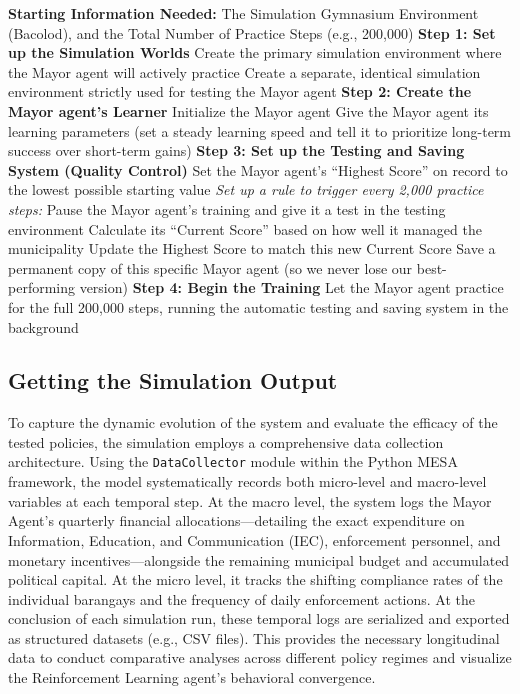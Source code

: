 \begin{algorithm}[H]
\caption{The Mayor Agent Training Algorithm}
\label{alg:drl_training_english}
\begin{algorithmic}[1]
\State \textbf{Starting Information Needed:} The Simulation Gymnasium Environment (Bacolod), and the Total Number of Practice Steps (e.g., 200,000)
\Statex
\State \textbf{Step 1: Set up the Simulation Worlds}
\State Create the primary simulation environment where the Mayor agent will actively practice
\State Create a separate, identical simulation environment strictly used for testing the Mayor agent
\Statex
\State \textbf{Step 2: Create the Mayor agent's Learner}
\State Initialize the Mayor agent
\State Give the Mayor agent its learning parameters (set a steady learning speed and tell it to prioritize long-term success over short-term gains)
\Statex
\State \textbf{Step 3: Set up the Testing and Saving System (Quality Control)}
\State Set the Mayor agent's ``Highest Score'' on record to the lowest possible starting value
\Statex
\State \textit{Set up a rule to trigger every 2,000 practice steps:} 
\State \quad Pause the Mayor agent's training and give it a test in the testing environment 
\State \quad Calculate its ``Current Score'' based on how well it managed the municipality
\State \quad {}
\State \quad \quad Update the Highest Score to match this new Current Score
\State \quad \quad Save a permanent copy of this specific Mayor agent (so we never lose our best-performing version)
\State \quad \EndIf
\Statex
\State \textbf{Step 4: Begin the Training}
\State Let the Mayor agent practice for the full 200,000 steps, running the automatic testing and saving system in the background
\end{algorithmic}
\end{algorithm}

\subsection{Getting the Simulation Output}
To capture the dynamic evolution of the system and evaluate the efficacy of the tested policies, the simulation employs a comprehensive data collection architecture. Using the \texttt{DataCollector} module within the Python MESA framework, the model systematically records both micro-level and macro-level variables at each temporal step. At the macro level, the system logs the Mayor Agent's quarterly financial allocations—detailing the exact expenditure on Information, Education, and Communication (IEC), enforcement personnel, and monetary incentives—alongside the remaining municipal budget and accumulated political capital. At the micro level, it tracks the shifting compliance rates of the individual barangays and the frequency of daily enforcement actions. At the conclusion of each simulation run, these temporal logs are serialized and exported as structured datasets (e.g., CSV files). This provides the necessary longitudinal data to conduct comparative analyses across different policy regimes and visualize the Reinforcement Learning agent's behavioral convergence.

